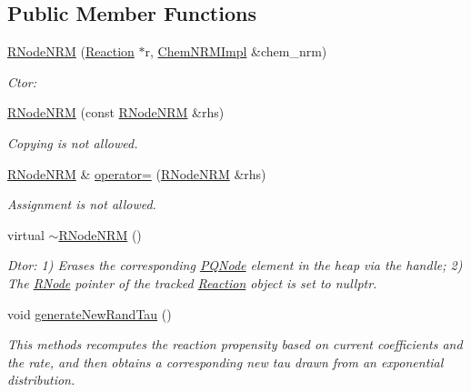\subsection*{Public Member Functions}
\begin{DoxyCompactItemize}
\item 
\hyperlink{classchem_1_1RNodeNRM_a7ab2483c555b42b19a3274ffa9a44d8e}{R\-Node\-N\-R\-M} (\hyperlink{classchem_1_1Reaction}{Reaction} $\ast$r, \hyperlink{classchem_1_1ChemNRMImpl}{Chem\-N\-R\-M\-Impl} \&chem\-\_\-nrm)
\begin{DoxyCompactList}\small\item\em Ctor\-: \end{DoxyCompactList}\item 
\hyperlink{classchem_1_1RNodeNRM_a12d79f33bd69c1b58e18fa4de0d500df}{R\-Node\-N\-R\-M} (const \hyperlink{classchem_1_1RNodeNRM}{R\-Node\-N\-R\-M} \&rhs)
\begin{DoxyCompactList}\small\item\em Copying is not allowed. \end{DoxyCompactList}\item 
\hyperlink{classchem_1_1RNodeNRM}{R\-Node\-N\-R\-M} \& \hyperlink{classchem_1_1RNodeNRM_aba4753c700f2f6d707e2c94b2c5e5749}{operator=} (\hyperlink{classchem_1_1RNodeNRM}{R\-Node\-N\-R\-M} \&rhs)
\begin{DoxyCompactList}\small\item\em Assignment is not allowed. \end{DoxyCompactList}\item 
virtual \hyperlink{classchem_1_1RNodeNRM_ada0f6d009280070f3b89a22ab05c32a2}{$\sim$\-R\-Node\-N\-R\-M} ()
\begin{DoxyCompactList}\small\item\em Dtor\-: 1) Erases the corresponding \hyperlink{classchem_1_1PQNode}{P\-Q\-Node} element in the heap via the handle; 2) The \hyperlink{classchem_1_1RNode}{R\-Node} pointer of the tracked \hyperlink{classchem_1_1Reaction}{Reaction} object is set to nullptr. \end{DoxyCompactList}\item 
void \hyperlink{classchem_1_1RNodeNRM_a33025de761dc8d29928f8e5b1148eff1}{generate\-New\-Rand\-Tau} ()
\begin{DoxyCompactList}\small\item\em This methods recomputes the reaction propensity based on current coefficients and the rate, and then obtains a corresponding new tau drawn from an exponential distribution. \end{DoxyCompactList}\item 

\end{DoxyCompactItemize}
